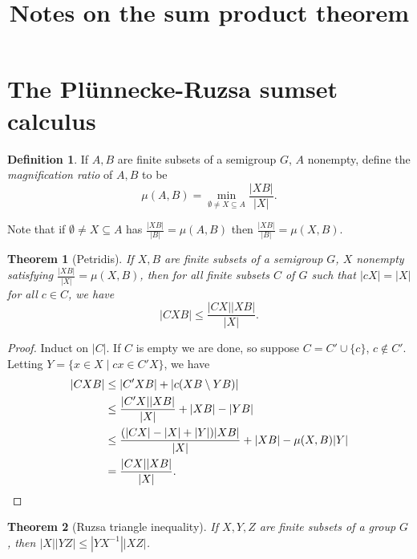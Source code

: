 \documentclass[letterpaper,11pt]{article}
\newtheorem{thm}{Theorem}
\theoremstyle{definition}
\newtheorem{defn}{Definition}
\theoremstyle{remark}
\begin{document}
\newcommand{\CC}{\mathbb{C}}
\newcommand{\FF}{\mathbb{F}}
\newcommand{\HH}{\mathbb{H}}
\newcommand{\NN}{\mathbb{N}}
\newcommand{\PP}{\mathbb{P}}
\newcommand{\RR}{\mathbb{R}}
\newcommand{\ZZ}{\mathbb{Z}}

\newcommand{\cK}{\mathcal{K}}
\newcommand{\cL}{\mathcal{L}}
\newcommand{\cO}{\mathcal{O}}

\title{Notes on the sum product theorem}
\date{}
\maketitle

\tableofcontents

\section{The Pl\"unnecke-Ruzsa sumset calculus}

\begin{defn} If $A,B$ are finite subsets of a semigroup $G$, $A$ nonempty, define the \emph{magnification ratio} of $A,B$ to be
\[
\mu(A,B) = \min_{\emptyset \ne X\subseteq A} \frac{|XB|}{|X|}.
\]
\end{defn}

Note that if $\emptyset \ne X\subseteq A$ has $\frac{|XB|}{|B|} = \mu(A,B)$ then $\frac{|XB|}{|B|} = \mu(X,B)$.

\begin{thm}[Petridis]\label{petridis} If $X,B$ are finite subsets of a semigroup $G$, $X$ nonempty satisfying $\frac{|XB|}{|X|} = \mu(X,B)$, then for all finite subsets $C$ of $G$ such that $|cX| = |X|$ for all $c\in C$, we have
\[
|CXB| \le \frac{|CX||XB|}{|X|}.
\]
\end{thm}
\begin{proof} Induct on $|C|$. If $C$ is empty we are done, so suppose $C = C' \cup \{c\}$, $c \not\in C'$. Letting $Y=\{x\in X\mid cx\in C'X\}$, we have
\begin{align*}
|CXB| &\le |C'XB| + |c(XB\setminus YB)|\\
&\le \frac{|C'X||XB|}{|X|} + |XB| - |YB|\\
&\le \frac{(|CX|-|X|+|Y|)|XB|}{|X|} +|XB| - \mu(X,B)|Y|\\
&= \frac{|CX||XB|}{|X|}.\qedhere
\end{align*}
\end{proof}

\begin{thm}[Ruzsa triangle inequality]\label{triangle} If $X,Y,Z$ are finite subsets of a group $G$, then $|X||YZ| \le |YX^{-1}||XZ|$.
\end{thm}
\end{document}
